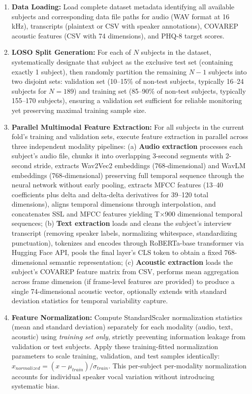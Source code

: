 \documentclass[12pt]{article}
\begin{document}
	\begin{enumerate}
		\item \textbf{Data Loading:} Load complete dataset metadata identifying all available subjects and corresponding data file paths for audio (WAV format at 16 kHz), transcripts (plaintext or CSV with speaker annotations), COVAREP acoustic features (CSV with 74 dimensions), and PHQ-8 target scores.

		\item \textbf{LOSO Split Generation:} For each of $N$ subjects in the dataset, systematically designate that subject as the exclusive test set (containing exactly 1 subject), then randomly partition the remaining $N-1$ subjects into two disjoint sets: validation set (10--15\% of non-test subjects, typically 16--24 subjects for $N=189$) and training set (85--90\% of non-test subjects, typically 155--170 subjects), ensuring a validation set sufficient for reliable monitoring yet preserving maximal training sample size.

		\item \textbf{Parallel Multimodal Feature Extraction:} For all subjects in the current fold's training and validation sets, execute feature extraction in parallel across three independent modality pipelines: (a) \textbf{Audio extraction} processes each subject's audio file, chunks it into overlapping 3-second segments with 2-second stride, extracts Wav2Vec2 embeddings (768-dimensional) and WavLM embeddings (768-dimensional) preserving full temporal sequence through the neural network without early pooling, extracts MFCC features (13--40 coefficients plus delta and delta-delta derivatives for 39--120 total dimensions), aligns temporal dimensions through interpolation, and concatenates SSL and MFCC features yielding T×900 dimensional temporal sequences; (b) \textbf{Text extraction} loads and cleans the subject's interview transcript (removing speaker labels, normalizing whitespace, standardizing punctuation), tokenizes and encodes through RoBERTa-base transformer via Hugging Face API, pools the final layer's CLS token to obtain a fixed 768-dimensional semantic representation; (c) \textbf{Acoustic extraction} loads the subject's COVAREP feature matrix from CSV, performs mean aggregation across frame dimension (if frame-level features are provided) to produce a single 74-dimensional acoustic vector, optionally extends with standard deviation statistics for temporal variability capture.

		\item \textbf{Feature Normalization:} Compute StandardScaler normalization statistics (mean and standard deviation) separately for each modality (audio, text, acoustic) using \textit{training set only}, strictly preventing information leakage from validation or test subjects. Apply these training-fitted normalization parameters to scale training, validation, and test samples identically: $x_{normalized} = (x - \mu_{train}) / \sigma_{train}$. This per-subject per-modality normalization accounts for individual speaker vocal variation without introducing systematic bias.


\end{enumerate}
\end{document}
